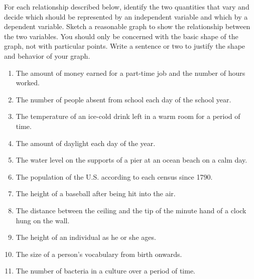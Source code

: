 \documentclass[10pt,]{book}
\theoremstyle{ptxdefinitionnotitle}
\theoremstyle{ptxdefinitiontitle}
\numberwithin{equation}{section}
\begin{document}
\begin{divisionexercise}{3}\hypertarget{exercise-3}{}
\hypertarget{p-32}{}%
For each relationship described below, identify the two quantities that vary and decide which should be represented by an independent variable and which by a dependent variable. Sketch a reasonable graph to show the relationship between the two variables.  You should only be concerned with the basic shape of the graph, not with particular points.  Write a sentence or two to justify the shape and behavior of your graph. \leavevmode%
\begin{enumerate}[label=\alph*)]
\item\hypertarget{li-11}{}The amount of money earned for a part-time job and the number of hours worked.%
\item\hypertarget{li-12}{}The number of people absent from school each day of the school year.%
\item\hypertarget{li-13}{}The temperature of an ice-cold drink left in a warm room for a period of time.%
\item\hypertarget{li-14}{}The amount of daylight each day of the year.%
\item\hypertarget{li-15}{}The water level on the supports of a pier at an ocean beach on a calm day.%
\item\hypertarget{li-16}{}The population of the U.S. according to each census since 1790.%
\item\hypertarget{li-17}{}The height of a baseball after being hit into the air.%
\item\hypertarget{li-18}{}The distance between the ceiling and the tip of the minute hand of a clock hung on the wall.%
\item\hypertarget{li-19}{}The height of an individual as he or she ages.%
\item\hypertarget{li-20}{}The size of a person's vocabulary from birth onwards.%
\item\hypertarget{li-21}{}The number of bacteria in a culture over a period of time.%
\end{enumerate}
%
\end{divisionexercise}%
\end{document}
